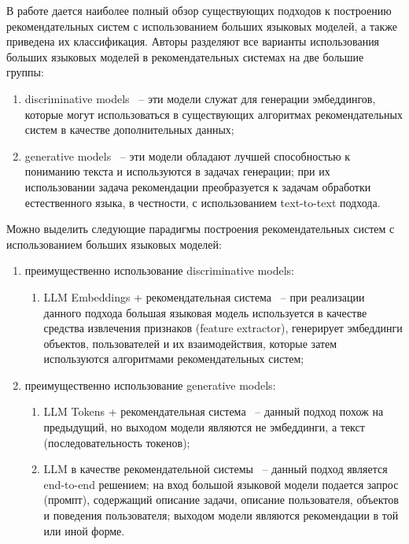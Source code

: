 В работе \cite{llm_rs_survey} дается наиболее полный обзор существующих подходов к построению рекомендательных систем с использованием больших языковых моделей, а также приведена их классификация. Авторы разделяют все варианты использования больших языковых моделей в рекомендательных системах на две большие группы:
\begin{enumerate}
    \item discriminative models ~-- эти модели служат для генерации эмбеддингов, которые могут использоваться в существующих алгоритмах рекомендательных систем в качестве дополнительных данных;
    \item generative models ~-- эти модели обладают лучшей способностью к пониманию текста и используются в задачах генерации; при их использовании задача рекомендации преобразуется к задачам обработки естественного языка, в честности, с использованием text-to-text подхода.
\end{enumerate}

Можно выделить следующие парадигмы построения рекомендательных систем с использованием больших языковых моделей:
\begin{enumerate}
    \item преимущественно использование discriminative models:
          \begin{enumerate}
              \item LLM Embeddings + рекомендательная система ~-- при реализации данного подхода большая языковая модель используется в качестве средства извлечения признаков (feature extractor), генерирует эмбеддинги объектов, пользователей и их взаимодействия, которые затем используются алгоритмами рекомендательных систем;
          \end{enumerate}
    \item преимущественно использование generative models:
          \begin{enumerate}
              \item LLM Tokens + рекомендательная система ~-- данный подход похож на предыдущий, но выходом модели являются не эмбеддинги, а текст (последовательность токенов);
              \item LLM в качестве рекомендательной системы ~-- данный подход является end-to-end решением; на вход большой языковой модели подается запрос (промпт), содержащий описание задачи, описание пользователя, объектов и поведения пользователя; выходом модели являются рекомендации в той или иной форме.
          \end{enumerate}
\end{enumerate}


